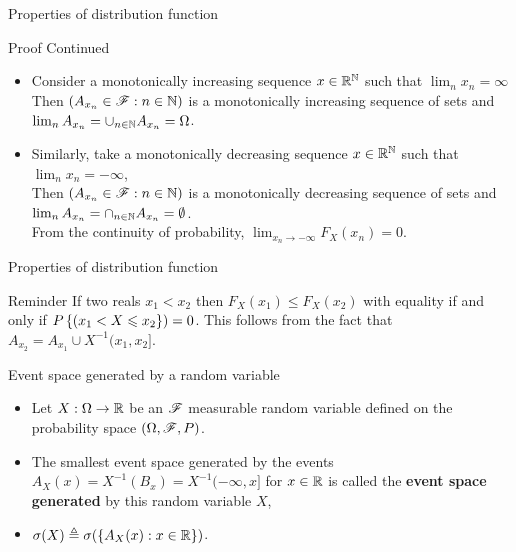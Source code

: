 \documentclass[12pt,aspectratio=169]{beamer}
\begin{document}
\begin{frame}{Properties of distribution function}
\begin{block}{Proof Continued}
\begin{itemize}
\item <1-> Consider a monotonically increasing sequence $x\in\mathbb{R}^{\mathbb{N}}$ such that $\lim_{n}x_n = \infty$\\
Then $(A_{x_n} \in \mathscr{F}: n \in \mathbb{N})$ is a monotonically increasing sequence of sets and $\lim_nA_{x_n} = \cup_{n \in \mathbb{N}}A_{x_n} = \Omega$.\\
\item <2-> Similarly, take a monotonically decreasing sequence $x\in \mathbb{R}^{\mathbb{N}}$ such that $\lim_{n}x_n = -\infty$,\\
Then $(A_{x_n} \in \mathscr{F}: n \in \mathbb{N})$ is a monotonically decreasing sequence of sets and $\lim_nA_{x_n} = \cap_{n \in \mathbb{N}}A_{x_n} = \emptyset$.\\
From the continuity of probability, $\lim_{x_n \to -\infty}F_X(x_n) = 0$. 
\end{itemize}
\end{block}
\end{frame}
\begin{frame}{Properties of distribution function}
\begin{block}{Reminder}
If two reals $x_1 < x_2$ then $F_X(x_1) \le F_X(x_2)$ with equality if and only if $P\left\{(x_1 < X \leqslant x_2\right\}) = 0$. 
This follows from the fact that $A_{x_2} = A_{x_1}\cup X^{-1}(x_1, x_2]$. 
\end{block}
\end{frame}
\begin{frame}{Event space generated by a random variable}
\begin{Definition} 
\begin{itemize}
\item <1-> Let $X: \Omega \to \mathbb{R}$ be an $\mathscr{F}$ measurable random variable defined on the probability space $(\Omega, \mathscr{F}, P)$.
\item <2-> The smallest event space generated by the events $A_X(x) = X^{-1}(B_x) = X^{-1}(-\infty, x]$ for $x \in \mathbb{R}$ is called the \textbf{event space generated} by this random variable $X$, 
\item <3-> $\sigma(X) \triangleq \sigma(\left\{A_X(x): x \in \mathbb{R}\right\})$. 
\end{itemize}
\end{Definition}
\end{frame}
\end{document}
